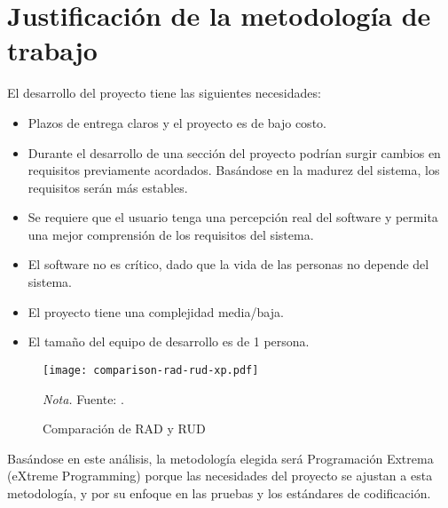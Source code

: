 \section{Justificación de la metodología de trabajo}
\label{sec:methodology-justification}

El desarrollo del proyecto tiene las siguientes necesidades:

\begin{itemize}
    \item Plazos de entrega claros y el proyecto es de bajo costo.
    \item Durante el desarrollo de una sección del proyecto podrían surgir cambios en requisitos previamente acordados.
    Basándose en la madurez del sistema, los requisitos serán más estables.
    \item Se requiere que el usuario tenga una percepción real del software y permita una mejor comprensión de los requisitos del sistema.
    \item El software no es crítico, dado que la vida de las personas no depende del sistema.
    \item El proyecto tiene una complejidad media/baja.
    \item El tamaño del equipo de desarrollo es de 1 persona.
\end{itemize}

\begin{figure}
    \centering
    \caption{Comparación de RAD y RUD}
    \texttt{[image: comparison-rad-rud-xp.pdf]}
    \label{fig:comparison-rad-rud-xp}

    \vspace{0.5em}
    \begin{minipage}{\textwidth}
        \small\textit{Nota.} Fuente: \textcite{geambasu2011influence}.
    \end{minipage}
\end{figure}

Basándose en este análisis, la metodología elegida será Programación Extrema (eXtreme Programming) porque las necesidades del proyecto se ajustan a esta metodología, y por su enfoque en las pruebas y los estándares de codificación.
